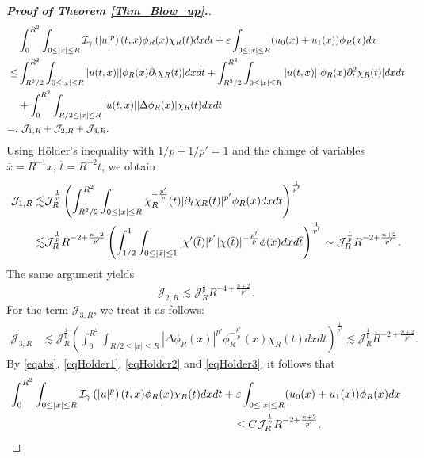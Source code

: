 \documentclass[10pt,a4paper]{amsart}
\begin{document}
\begin{proof}[\textbf{Proof of Theorem \ref{Thm_Blow_up}.}]
\begin{align}
&\int_0^{R^2}\int_{0 \leq |x| \leq R} \mathcal{I}_{\gamma} \left(|u|^p\right)(t,x)\phi_R(x)\chi_R(t)dxdt+\varepsilon\int_{0 \leq |x| \leq R}(u_0(x)+u_1(x))\phi_R(x)dx \notag\\
\leq & \int_{R^2/2}^{R^2}\int_{0 \leq |x| \leq R} |u(t, x)| |\phi_R(x) \partial_t\chi_R(t)|dxdt+\int_{R^2/2}^{R^2}\int_{0 \leq |x| \leq R} |u(t, x)||\phi_R(x) \partial_t^2\chi_R(t)|dxdt \notag\\
&+
\int_0^{R^2}\int_{R/2 \leq |x| \leq R}|u(t, x)||\Delta \phi_R(x)|\chi_R(t)dxdt \notag\\
=:&\,\,\mathcal{J}_{1,R} + \mathcal{J}_{2,R} + \mathcal{J}_{3,R}. \label{eqabs}
\end{align}
Using H\"older's inequality with $1/p + 1/p' = 1$ and the change of
variables $\overline{x}=R^{-1}x$, $\overline{t}=R^{-2}t$, we obtain
\begin{align}
\mathcal{J}_{1,R}
\lesssim & \mathcal{J}_R^{\frac{1}{p
}}\left(\int_{R^2/2}^{R^2}\int_{0 \leq |x| \leq R}\chi^{-\frac{p'}{p}}_R(t) |\partial_t\chi_R(t)|^{p'}\phi_R(x)dxdt\right)^{\frac{1}{p'}} \notag\\
\lesssim& \mathcal{J}_R^{\frac{1}{p}}R^{-2+\frac{n+2}{p'}} \left(\int_{1/2}^{1}\int_{0 \leq |\bar{x}| \leq 1} |\chi^{\prime}(\overline{t})|^{p'}|\chi(\overline{t})|^{-\frac{p^{\prime}}{p}}\phi(\overline{x}) d\overline{x}d\overline{t}\right)^{\frac{1}{p'}} \sim \mathcal{J}_R^{\frac{1}{p}}R^{-2+\frac{n+2}{p'}}.\label{eqHolder1}
\end{align}
The same argument yields
\begin{equation}\label{eqHolder2}
\mathcal{J}_{2,R} \lesssim \mathcal{J}_R^{\frac{1}{p}}R^{-4+\frac{n+2}{p'}}.
\end{equation}
For the term $\mathcal{J}_{3,R}$, we treat it as follows:
\begin{align}
\mathcal{J}_{3,R}
&\lesssim \mathcal{J}_R^{\frac{1}{p}}
\left(\int_0^{R^2}\int_{R/2 \leq |x| \leq R} |\Delta\phi_R(x)|^{p'} \phi_R^{-\frac{p'}{p}}(x)\chi_R(t)dxdt\right)^{\frac{1}{p'}} \lesssim \mathcal{J}_R^{\frac{1}{p}}R^{-2+\frac{n+2}{p'}}. \label{eqHolder3}
\end{align}
By \eqref{eqabs}, \eqref{eqHolder1}, \eqref{eqHolder2} and \eqref{eqHolder3}, it follows that
\begin{align} \label{I_u^p}
\int_0^{R^2}\int_{0 \leq |x| \leq R} \mathcal{I}_{\gamma} \left(|u|^p\right)(t,x)\phi_R(x)\chi_R(t)dxdt &+\varepsilon\int_{0 \leq |x| \leq R}(u_0(x)+u_1(x))\phi_{R}(x)dx\notag\\ &\quad\leq C \mathcal{J}_R^{\frac{1}{p}}R^{-2+\frac{n+2}{p'}}.

\end{align}
\end{proof}
\end{document}
